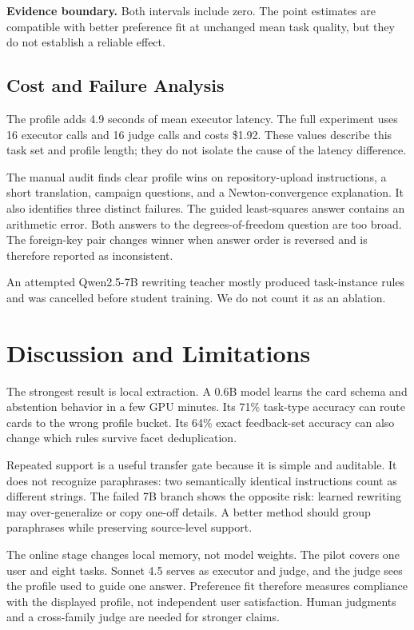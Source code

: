 \documentclass{article}
\newcommand{\cautionbox}[1]{%
  \par\smallskip
  \noindent\colorbox{pamber!17}{%
    \parbox{\dimexpr\linewidth-2\fboxsep\relax}{%
      \textbf{\textcolor{pamber!55!black}{\faIcon{exclamation-triangle}\quad Evidence boundary.}} #1%
    }}\par\smallskip}
\begin{document}
\cautionbox{Both intervals include zero. The point estimates are compatible
with better preference fit at unchanged mean task quality, but they do not
establish a reliable effect.}

\subsection{Cost and Failure Analysis}

The profile adds 4.9 seconds of mean executor latency. The full experiment
uses 16 executor calls and 16 judge calls and costs \$1.92. These values
describe this task set and profile length; they do not isolate the cause of the
latency difference.

The manual audit finds clear profile wins on repository-upload instructions, a
short translation, campaign questions, and a Newton-convergence explanation.
It also identifies three distinct failures. The guided least-squares answer
contains an arithmetic error. Both answers to the degrees-of-freedom question
are too broad. The foreign-key pair changes winner when answer order is
reversed and is therefore reported as inconsistent.

An attempted Qwen2.5-7B rewriting teacher mostly produced task-instance rules
and was cancelled before student training. We do not count it as an ablation.

\section{Discussion and Limitations}
\label{sec:discussion}

The strongest result is local extraction. A 0.6B model learns the card schema
and abstention behavior in a few GPU minutes. Its 71\% task-type accuracy can
route cards to the wrong profile bucket. Its 64\% exact feedback-set accuracy
can also change which rules survive facet deduplication.

Repeated support is a useful transfer gate because it is simple and auditable.
It does not recognize paraphrases: two semantically identical instructions
count as different strings. The failed 7B branch shows the opposite risk:
learned rewriting may over-generalize or copy one-off details. A better method
should group paraphrases while preserving source-level support.

The online stage changes local memory, not model weights. The pilot covers one
user and eight tasks. Sonnet 4.5 serves as executor and judge, and the judge
sees the profile used to guide one answer. Preference fit therefore measures
compliance with the displayed profile, not independent user satisfaction.
Human judgments and a cross-family judge are needed for stronger claims.
\end{document}
